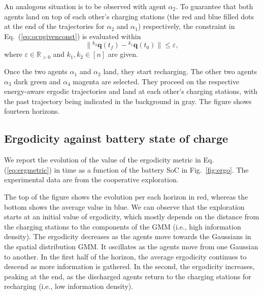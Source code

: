 \documentclass[letterpaper,10pt,conference,twoside]{IEEEtran}
\theoremstyle{definition}
\begin{document}
An analogous situation is to be observed with agent $\alpha_2$. %
To guarantee that both agents land %
on top of each other's charging stations (the red and blue filled dots at the end of the trajectories for $\alpha_2$ and $\alpha_1$) respectively, %
the constraint in Eq.~(\ref{eq:ocpgivenconst}) is evaluated within
\begin{equation}\label{eq:resaddconst}
  \lVert{}^{k_2}\mathbf{q}(t_f)-{}^{k_1}\mathbf{q}(t_0)\rVert\leq\varepsilon,
\end{equation} 
where $\varepsilon\in\mathbb{R}_{>0}$ and $k_1,k_2\in[n]$ are given.

Once the two agents $\alpha_1$ and $\alpha_2$ land, they start recharging. %
The other two agents $\alpha_3$ dark green and $\alpha_4$ magenta are selected. %
They proceed on the respective energy-aware ergodic trajectories and land at each other's charging stations, with the past trajectory being indicated in the background in gray. The figure shows fourteen horizons. %

\subsection*{Ergodicity against battery state of charge}
\noindent
We report the evolution of the value of the ergodicity metric in Eq. (\ref{eq:ergmetric}) in time as a function of the battery SoC in Fig.~\ref{fig:ergo}. The experimental data are from the cooperative exploration.%

The top of the figure shows the evolution per each horizon in red, whereas the bottom shows the average value in blue. We can observe that the exploration starts at an initial value of ergodicity, which mostly depends on the distance from the charging stations to the components of the GMM (i.e., high information density). The ergodicity decreases as the agents move towards the Gaussians in the spatial distribution GMM. It oscillates as the agents move from one Gaussian to another. In the first half of the horizon, the average ergodicity continues to descend as more information is gathered. In the second, the ergodicity increases, peaking at the end, as the discharged agents return to the charging stations for recharging (i.e., low information density).
\end{document}
